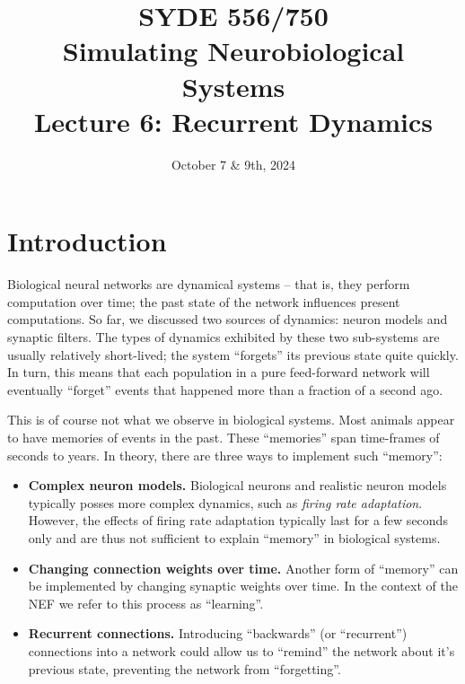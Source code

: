 \documentclass[10pt,letterpaper,oneside]{article}
\date{October 7 \& 9th, 2024}
\title{SYDE 556/750 \\ Simulating Neurobiological Systems \\ Lecture 6: Recurrent Dynamics}
\begin{document}

\section{Introduction}


Biological neural networks are dynamical systems -- that is, they perform computation over time; the past state of the network influences present computations. So far, we discussed two sources of dynamics: neuron models and synaptic filters. The types of dynamics exhibited by these two sub-systems are usually relatively short-lived; the system \enquote{forgets} its previous state quite quickly. In turn, this means that each population in a pure feed-forward network will eventually \enquote{forget} events that happened more than a fraction of a second ago.


This is of course not what we observe in biological systems. Most animals appear to have memories of events in the past. These \enquote{memories} span time-frames of seconds to years. In theory, there are three ways to implement such \enquote{memory}:
\begin{itemize}
	\item \textbf{Complex neuron models.} Biological neurons and realistic neuron models typically posses more complex dynamics, such as \emph{firing rate adaptation}. However, the effects of firing rate adaptation typically last for a few seconds only and are thus not sufficient to explain \enquote{memory} in biological systems.
	\item \textbf{Changing connection weights over time.} Another form of \enquote{memory} can be implemented by changing synaptic weights over time. In the context of the NEF we refer to this process as \enquote{learning}.
	\item \textbf{Recurrent connections.} Introducing \enquote{backwards} (or \enquote{recurrent}) connections into a network could allow us to \enquote{remind} the network about it's previous state, preventing the network from \enquote{forgetting}.
\end{itemize}
\end{document}
